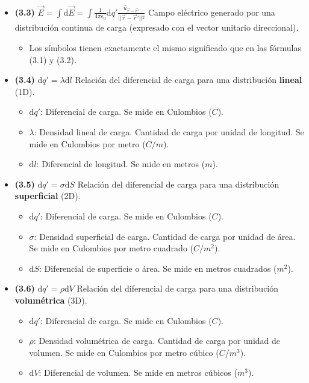 \documentclass{article}
\begin{document}
\begin{itemize}
				\item \textbf{(3.3)} $\boxed{\vec{E} = \int \mathrm{d}\vec{E} = \int \frac{1}{4\pi\epsilon_{0}} \mathrm{d}q' \frac{\hat{u}_{\vec{r}-\vec{r}'}}{\vert{}\vert{}\vec{r} - \vec{r}'\vert{}\vert{}^2}}$ Campo eléctrico generado por una distribución continua de carga (expresado con el vector unitario direccional).
					\begin{itemize}
						\item Los símbolos tienen exactamente el mismo significado que en las fórmulas (3.1) y (3.2).
					\end{itemize}

				\item \textbf{(3.4)} $\boxed{\mathrm{d}q' = \lambda \mathrm{d}l}$ Relación del diferencial de carga para una distribución \textbf{lineal} (1D).
					\begin{itemize}
						\item $\mathrm{d}q'$: Diferencial de carga. Se mide en Culombios ($C$).
						\item $\lambda$: Densidad lineal de carga. Cantidad de carga por unidad de longitud. Se mide en Culombios por metro ($C/m$).
						\item $\mathrm{d}l$: Diferencial de longitud. Se mide en metros ($m$).
					\end{itemize}

				\item \textbf{(3.5)} $\boxed{\mathrm{d}q' = \sigma \mathrm{d}S}$ Relación del diferencial de carga para una distribución \textbf{superficial} (2D).
					\begin{itemize}
						\item $\mathrm{d}q'$: Diferencial de carga. Se mide en Culombios ($C$).
						\item $\sigma$: Densidad superficial de carga. Cantidad de carga por unidad de área. Se mide en Culombios por metro cuadrado ($C/m^2$).
						\item $\mathrm{d}S$: Diferencial de superficie o área. Se mide en metros cuadrados ($m^2$).
					\end{itemize}

				\item \textbf{(3.6)} $\boxed{\mathrm{d}q' = \rho \mathrm{d}V}$ Relación del diferencial de carga para una distribución \textbf{volumétrica} (3D).
					\begin{itemize}
						\item $\mathrm{d}q'$: Diferencial de carga. Se mide en Culombios ($C$).
						\item $\rho$: Densidad volumétrica de carga. Cantidad de carga por unidad de volumen. Se mide en Culombios por metro cúbico ($C/m^3$).
						\item $\mathrm{d}V$: Diferencial de volumen. Se mide en metros cúbicos ($m^3$).
					\end{itemize}


\end{itemize}
\end{document}
